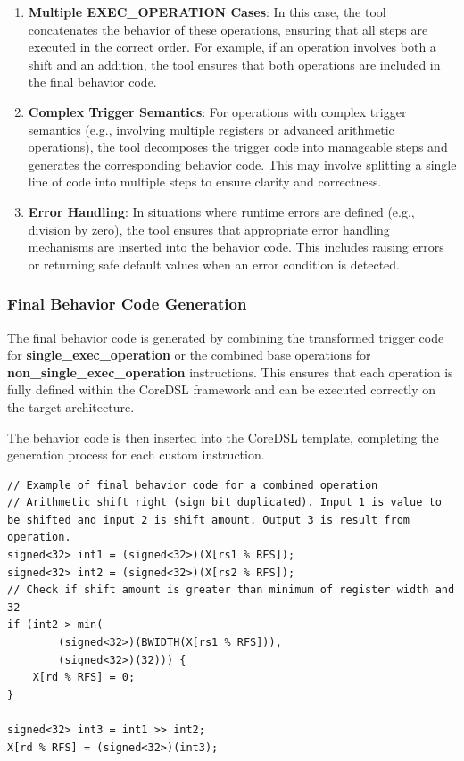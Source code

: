 \begin{enumerate}
    \item \textbf{Multiple \textbf{EXEC\_OPERATION} Cases}: In this case, the tool concatenates the behavior of these operations, ensuring that all steps are executed in the correct order. For example, if an operation involves both a shift and an addition, the tool ensures that both operations are included in the final behavior code.

    \item \textbf{Complex Trigger Semantics}: For operations with complex trigger semantics (e.g., involving multiple registers or advanced arithmetic operations), the tool decomposes the trigger code into manageable steps and generates the corresponding behavior code. This may involve splitting a single line of code into multiple steps to ensure clarity and correctness.

    \item \textbf{Error Handling}: In situations where runtime errors are defined (e.g., division by zero), the tool ensures that appropriate error handling mechanisms are inserted into the behavior code. This includes raising errors or returning safe default values when an error condition is detected.
\end{enumerate}

\subsubsection{Final Behavior Code Generation}

The final behavior code is generated by combining the transformed trigger code for \textbf{single\_exec\_operation} or the combined base operations for \textbf{non\_single\_exec\_operation} instructions. This ensures that each operation is fully defined within the CoreDSL framework and can be executed correctly on the target architecture.

The behavior code is then inserted into the CoreDSL template, completing the generation process for each custom instruction.

\begin{lstlisting}
// Example of final behavior code for a combined operation
// Arithmetic shift right (sign bit duplicated). Input 1 is value to be shifted and input 2 is shift amount. Output 3 is result from operation.
signed<32> int1 = (signed<32>)(X[rs1 % RFS]);
signed<32> int2 = (signed<32>)(X[rs2 % RFS]);
// Check if shift amount is greater than minimum of register width and 32
if (int2 > min(
        (signed<32>)(BWIDTH(X[rs1 % RFS])),
        (signed<32>)(32))) {
    X[rd % RFS] = 0;
}

signed<32> int3 = int1 >> int2;
X[rd % RFS] = (signed<32>)(int3);
\end{lstlisting}

